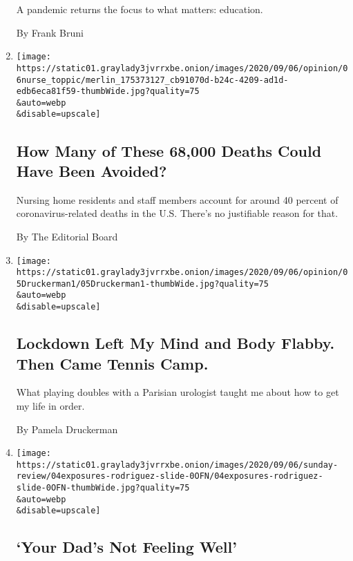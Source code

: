 \begin{enumerate}
  A pandemic returns the focus to what matters: education.

  By Frank Bruni
\item
  \href{/2020/09/05/opinion/sunday/coronavirus-nursing-homes-deaths.html}{}

  \texttt{[image: https://static01.graylady3jvrrxbe.onion/images/2020/09/06/opinion/06nurse\_toppic/merlin\_175373127\_cb91070d-b24c-4209-ad1d-edb6eca81f59-thumbWide.jpg?quality=75\\\&auto=webp\\\&disable=upscale]}

  \hypertarget{how-many-of-these-68000-deaths-could-have-been-avoided}{%
  \subsection{How Many of These 68,000 Deaths Could Have Been
  Avoided?}\label{how-many-of-these-68000-deaths-could-have-been-avoided}}

  Nursing home residents and staff members account for around 40 percent
  of coronavirus-related deaths in the U.S. There's no justifiable
  reason for that.

  By The Editorial Board
\item
  \href{/2020/09/05/opinion/sunday/coronavirus-tennis.html}{}

  \texttt{[image: https://static01.graylady3jvrrxbe.onion/images/2020/09/06/opinion/05Druckerman1/05Druckerman1-thumbWide.jpg?quality=75\\\&auto=webp\\\&disable=upscale]}

  \hypertarget{lockdown-left-my-mind-and-body-flabby-then-came-tennis-camp}{%
  \subsection{Lockdown Left My Mind and Body Flabby. Then Came Tennis
  Camp.}\label{lockdown-left-my-mind-and-body-flabby-then-came-tennis-camp}}

  What playing doubles with a Parisian urologist taught me about how to
  get my life in order.

  By Pamela Druckerman
\item
  \href{/2020/09/04/opinion/sunday/your-dads-not-feeling-well.html}{}

  \texttt{[image: https://static01.graylady3jvrrxbe.onion/images/2020/09/06/sunday-review/04exposures-rodriguez-slide-0OFN/04exposures-rodriguez-slide-0OFN-thumbWide.jpg?quality=75\\\&auto=webp\\\&disable=upscale]}

  \hypertarget{your-dads-not-feeling-well}{%
  \subsection{`Your Dad's Not Feeling
  Well'}\label{your-dads-not-feeling-well}}


\end{enumerate}
